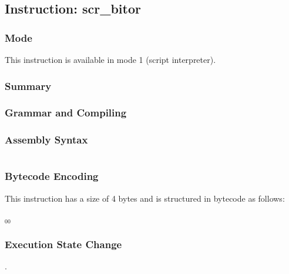 \subsection{Instruction: scr\_bitor}

\subsubsection{Mode}
This instruction is available in mode 1 (script interpreter).
\subsubsection{Summary}


\subsubsection{Grammar and Compiling}


\subsubsection{Assembly Syntax}

\begin{myquote}
\begin{verbatim}

\end{verbatim}
\end{myquote}

\subsubsection{Bytecode Encoding}

This instruction has a size of 4 bytes and is structured in bytecode as follows:

$_{00}$\ 


\subsubsection{Execution State Change}

.



